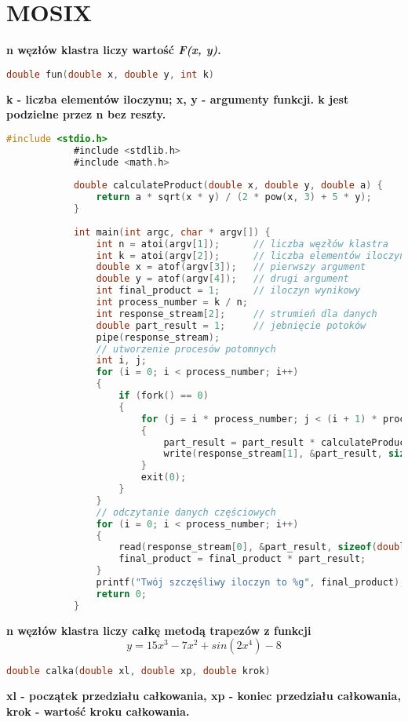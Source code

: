 \section{MOSIX}
		\textbf{n węzłów klastra liczy wartość \textit{F(x, y)}.}
		\begin{lstlisting}[language=C]
			double fun(double x, double y, int k)
		\end{lstlisting}
		\textbf{k - liczba elementów iloczynu; x, y - argumenty funkcji. k jest podzielne przez n bez reszty.}
		\begin{lstlisting}[language=C]
			#include <stdio.h>
			#include <stdlib.h>
			#include <math.h>
			
			double calculateProduct(double x, double y, double a) {
				return a * sqrt(x * y) / (2 * pow(x, 3) + 5 * y);
			}
			
			int main(int argc, char * argv[]) {
				int n = atoi(argv[1]);		// liczba węzłów klastra
				int k = atoi(argv[2]);		// liczba elementów iloczynu
				double x = atof(argv[3]);	// pierwszy argument
				double y = atof(argv[4]);	// drugi argument
				int final_product = 1;		// iloczyn wynikowy
				int process_number = k / n;
				int response_stream[2];		// strumień dla danych
				double part_result = 1;		// jebnięcie potoków
				pipe(response_stream);
				// utworzenie procesów potomnych
				int i, j;
				for (i = 0; i < process_number; i++)
				{
					if (fork() == 0)
					{
						for (j = i * process_number; j < (i + 1) * process_number; j++)
						{
							part_result = part_result * calculateProduct(x, y, j);
							write(response_stream[1], &part_result, sizeof(double));
						}
						exit(0);
					}
				}
				// odczytanie danych częściowych
				for (i = 0; i < process_number; i++)
				{
					read(response_stream[0], &part_result, sizeof(double));
					final_product = final_product * part_result;
				}
				printf("Twój szczęśliwy iloczyn to %g", final_product);
				return 0;
			}
		\end{lstlisting}
			\textbf{n węzłów klastra liczy całkę metodą trapezów z funkcji 	$$ y=15x^3-7x^2+sin(2x^4)-8 $$}
			\begin{lstlisting}[language=C]
				double calka(double xl, double xp, double krok)
			\end{lstlisting}
		\textbf{xl - początek przedziału całkowania, xp - koniec przedziału całkowania, krok - wartość kroku całkowania.}
